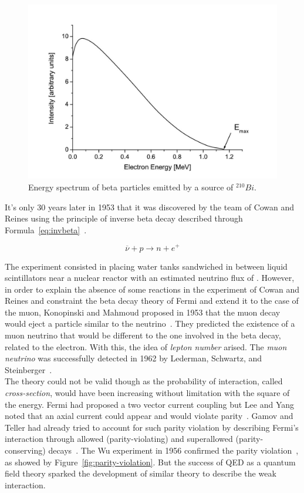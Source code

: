 	\begin{figure}[H]
		\centering
		\includegraphics[width=\plotwidth]{fig/chapt2/Beta-decay-electron-spectrum.jpg}
		\caption{\label{fig:beta-decay} Energy spectrum of beta particles emitted by a source of $^{210}Bi$.}
	\end{figure}
	
	It's only 30 years later in 1953 that it was discovered by the team of Cowan and Reines using the principle of inverse beta decay described through Formula~\ref{eq:invbeta}~\cite{COWAN1953}.
	
	\begin{equation}
		\label{eq:invbeta}
		\overline{\nu} + p \rightarrow n + e^+
	\end{equation}
	
	The experiment consisted in placing water tanks sandwiched in between liquid scintillators near a nuclear reactor with an estimated neutrino flux of \siflux. However, in order to explain the absence of some reactions in the experiment of Cowan and Reines and constraint the beta decay theory of Fermi and extend it to the case of the muon, Konopinski and Mahmoud proposed in 1953 that the muon decay would eject a particle similar to the neutrino~\cite{KONOPINSKI1953}. They predicted the existence of a muon neutrino that would be different to the one involved in the beta decay, related to the electron. With this, the idea of \textit{lepton number} arised. The \textit{muon neutrino} was successfully detected in 1962 by Lederman, Schwartz, and Steinberger~\cite{LEDERMAN1962}.\\
	
	The theory could not be valid though as the probability of interaction, called \textit{cross-section}, would have been increasing without limitation with the square of the energy. Fermi had proposed a two vector current coupling but Lee and Yang noted that an axial current could appear and would violate parity~\cite{LEE1956}. Gamov and Teller had already tried to account for such parity violation by describing Fermi's interaction through allowed (parity-violating) and superallowed (parity-conserving) decays~\cite{GAMOW1936}. The Wu experiment in 1956 confirmed the parity violation~\cite{WU1957}, as showed by Figure~\ref{fig:parity-violation}. But the success of QED as a quantum field theory sparked the development of similar theory to describe the weak interaction.
	
